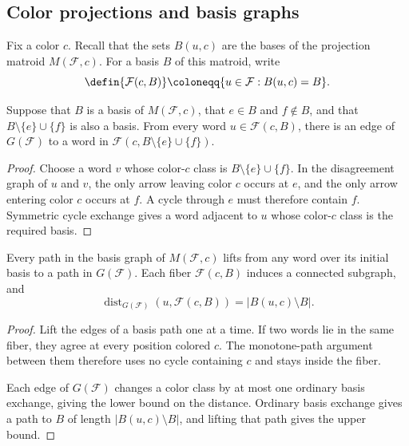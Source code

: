 \subsection[colorProjections]{Color projections and basis graphs}

Fix a color $c$. Recall that the sets $B(u,c)$ are the bases of the projection
matroid $M(\mathcal F,c)$. For a basis $B$ of this matroid, write
\[
 \defin{\mathcal F(c,B)}
 \coloneqq
 \{u\in\mathcal F:B(u,c)=B\}.
\]

\begin{proposition}
Suppose that $B$ is a basis of $M(\mathcal F,c)$, that $e\in B$ and
$f\notin B$, and that $B\setminus\{e\}\cup\{f\}$ is also a basis.
From every word $u\in\mathcal F(c,B)$, there is an edge of
$G(\mathcal F)$ to a word in
$\mathcal F(c,B\setminus\{e\}\cup\{f\})$.
\end{proposition}

\begin{proof}
Choose a word $v$ whose color-$c$ class is
$B\setminus\{e\}\cup\{f\}$. In the disagreement graph of $u$ and $v$, the
only arrow leaving color $c$ occurs at $e$, and the only arrow entering color
$c$ occurs at $f$. A cycle through $e$ must therefore contain $f$. Symmetric
cycle exchange gives a word adjacent to $u$ whose color-$c$ class is the
required basis.
\end{proof}

\begin{corollary}
Every path in the basis graph of $M(\mathcal F,c)$ lifts from any word over
its initial basis to a path in $G(\mathcal F)$. Each fiber
$\mathcal F(c,B)$ induces a connected subgraph, and
\[
 \operatorname{dist}_{G(\mathcal F)}(u,\mathcal F(c,B))
 =\lvert B(u,c)\setminus B\rvert.
\]
\end{corollary}

\begin{proof}
Lift the edges of a basis path one at a time. If two words lie in the same
fiber, they agree at every position colored $c$. The monotone-path argument
between them therefore uses no cycle containing $c$ and stays inside the
fiber.

Each edge of $G(\mathcal F)$ changes a color class by at most one ordinary
basis exchange, giving the lower bound on the distance. Ordinary basis
exchange gives a path to $B$ of length $\lvert B(u,c)\setminus B\rvert$, and
lifting that path gives the upper bound.
\end{proof}

